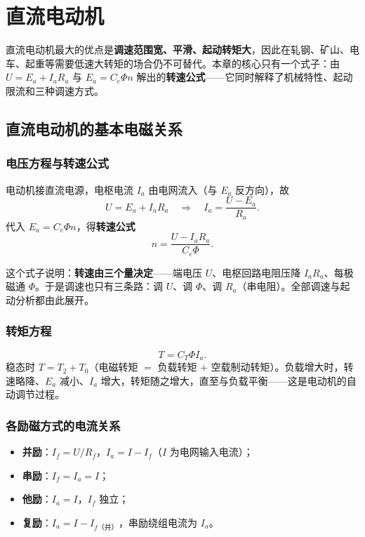 \chapter{直流电动机}

直流电动机最大的优点是\textbf{调速范围宽、平滑、起动转矩大}，因此在轧钢、矿山、电车、起重等需要低速大转矩的场合仍不可替代。本章的核心只有一个式子：由 $U=E_a+I_aR_a$ 与 $E_a=C_e\Phi n$ 解出的\textbf{转速公式}——它同时解释了机械特性、起动限流和三种调速方式。

\section{直流电动机的基本电磁关系}

\subsection{电压方程与转速公式}
电动机接直流电源，电枢电流 $I_a$ 由电网流入（与 $E_a$ 反方向），故
\begin{equation}
U=E_a+I_aR_a\quad\Longrightarrow\quad
I_a=\frac{U-E_a}{R_a}.
\end{equation}
代入 $E_a=C_e\Phi n$，得\textbf{转速公式}
\begin{equation}
n=\frac{U-I_aR_a}{C_e\Phi}.
\end{equation}


这个式子说明：\textbf{转速由三个量决定}——端电压 $U$、电枢回路电阻压降 $I_aR_a$、每极磁通 $\Phi$。于是调速也只有三条路：调 $U$、调 $\Phi$、调 $R_a$（串电阻）。全部调速与起动分析都由此展开。

\subsection{转矩方程}
\begin{equation}
T=C_T\Phi I_a .
\end{equation}
稳态时 $T=T_2+T_0$（电磁转矩 $=$ 负载转矩 $+$ 空载制动转矩）。负载增大时，转速略降、$E_a$ 减小、$I_a$ 增大，转矩随之增大，直至与负载平衡——这是电动机的自动调节过程。

\subsection{各励磁方式的电流关系}
\begin{itemize}
  \item \textbf{并励}：$I_f=U/R_f$，$I_a=I-I_f$（$I$ 为电网输入电流）；
  \item \textbf{串励}：$I_f=I_a=I$；
  \item \textbf{他励}：$I_a=I$，$I_f$ 独立；
  \item \textbf{复励}：$I_a=I-I_{f\text{（并）}}$，串励绕组电流为 $I_a$。
\end{itemize}

